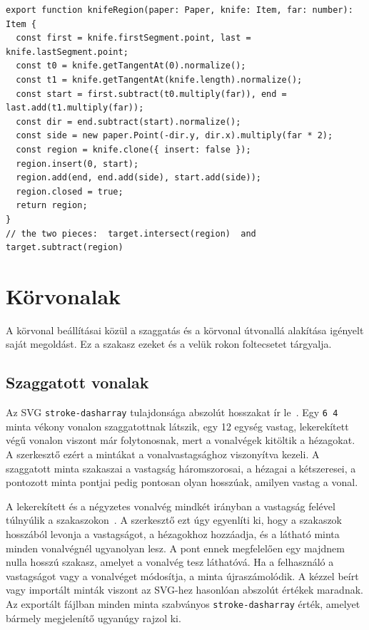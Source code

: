 \begin{lstlisting}[style=TS, caption={A késből épített vágó terület (\texttt{utils/boolean.ts})}, label=lst:knife]
export function knifeRegion(paper: Paper, knife: Item, far: number): Item {
  const first = knife.firstSegment.point, last = knife.lastSegment.point;
  const t0 = knife.getTangentAt(0).normalize();
  const t1 = knife.getTangentAt(knife.length).normalize();
  const start = first.subtract(t0.multiply(far)), end = last.add(t1.multiply(far));
  const dir = end.subtract(start).normalize();
  const side = new paper.Point(-dir.y, dir.x).multiply(far * 2);
  const region = knife.clone({ insert: false });
  region.insert(0, start);
  region.add(end, end.add(side), start.add(side));
  region.closed = true;
  return region;
}
// the two pieces:  target.intersect(region)  and  target.subtract(region)
\end{lstlisting}

\section{Körvonalak}
\label{sec:strokes}

A körvonal beállításai közül a szaggatás és a körvonal útvonallá alakítása igényelt saját megoldást. Ez a szakasz ezeket és a velük rokon foltecsetet tárgyalja.

\subsection{Szaggatott vonalak}

Az SVG \texttt{stroke-dasharray} tulajdonsága abszolút hosszakat ír le~\cite{w3c-svg-painting}. Egy \texttt{6 4} minta vékony vonalon szaggatottnak látszik, egy 12 egység vastag, lekerekített végű vonalon viszont már folytonosnak, mert a vonalvégek kitöltik a hézagokat. A szerkesztő ezért a mintákat a vonalvastagsághoz viszonyítva kezeli. A szaggatott minta szakaszai a vastagság háromszorosai, a hézagai a kétszeresei, a pontozott minta pontjai pedig pontosan olyan hosszúak, amilyen vastag a vonal.

A lekerekített és a négyzetes vonalvég mindkét irányban a vastagság felével túlnyúlik a szakaszokon~\cite{w3c-svg-painting}. A szerkesztő ezt úgy egyenlíti ki, hogy a szakaszok hosszából levonja a vastagságot, a hézagokhoz hozzáadja, és a látható minta minden vonalvégnél ugyanolyan lesz. A pont ennek megfelelően egy majdnem nulla hosszú szakasz, amelyet a vonalvég tesz láthatóvá. Ha a felhasználó a vastagságot vagy a vonalvéget módosítja, a minta újraszámolódik. A kézzel beírt vagy importált minták viszont az SVG-hez hasonlóan abszolút értékek maradnak. Az exportált fájlban minden minta szabványos \texttt{stroke-dasharray} érték, amelyet bármely megjelenítő ugyanúgy rajzol ki.

